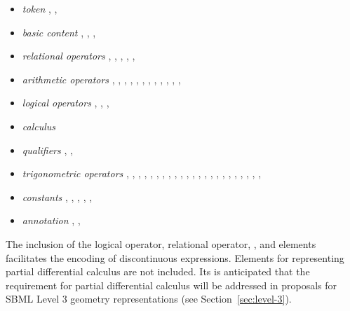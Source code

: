 \documentclass[10pt]{cekarticle}
\begin{document}
\begin{itemize}

\item \emph{token} , , 

\item \emph{basic content} , ,
, 

\item \emph{relational operators}
            , , , , , 

\item \emph{arithmetic operators}
            , , ,
            , , ,
            , , , ,
            , , 

\item \emph{logical operators}
            , , , 

\item \emph{calculus}

\item \emph{qualifiers}
            , , 

\item \emph{trigonometric operators}
            , , , ,
            , , , ,
            , , ,
            , , ,
            , , , ,
            , , ,
            , , 

\item \emph{constants}
            , , ,
            , , 

\item \emph{annotation}
            , ,
\end{itemize}

The inclusion of the logical operator, relational operator, ,  and  elements facilitates the encoding of discontinuous expressions.  Elements for representing partial differential calculus are not included.  Its is anticipated that the requirement for partial differential calculus will be addressed in proposals for SBML Level 3 geometry representations (see Section~\ref{sec:level-3}).
\end{document}
